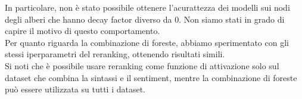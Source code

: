 In particolare, non è stato possibile ottenere l'acurattezza dei modelli sui
nodi degli alberi che hanno decay factor diverso da 0. Non siamo stati in grado
di capire il motivo di questo comportamento.\\
Per quanto riguarda la combinazione di foreste, abbiamo sperimentato con gli
stessi iperparametri del reranking, ottenendo risultati simili.\\
Si noti che è possibile usare reranking come funzione di attivazione solo sul
dataset che combina la sintassi e il sentiment, mentre la combinazione di
foreste può essere utilizzata su tutti i dataset.

